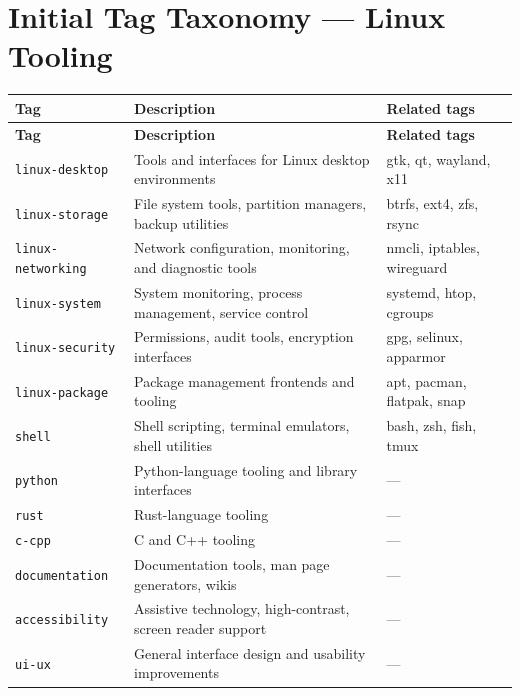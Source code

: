 \documentclass[12pt,a4paper]{article}
\begin{document}
\section{Initial Tag Taxonomy --- Linux Tooling}
\begin{longtable}{L{3.2cm} L{6.5cm} L{3.6cm}}
  \color{white}\bfseries Tag & \color{white}\bfseries Description & \color{white}\bfseries Related tags \\
  \endfirsthead
  \color{white}\bfseries Tag & \color{white}\bfseries Description & \color{white}\bfseries Related tags \\
  \endhead\hline
  \texttt{linux-desktop}    & Tools and interfaces for Linux desktop environments & gtk, qt, wayland, x11 \\
  \texttt{linux-storage}    & File system tools, partition managers, backup utilities & btrfs, ext4, zfs, rsync \\
  \texttt{linux-networking} & Network configuration, monitoring, and diagnostic tools & nmcli, iptables, wireguard \\
  \texttt{linux-system}     & System monitoring, process management, service control & systemd, htop, cgroups \\
  \texttt{linux-security}   & Permissions, audit tools, encryption interfaces & gpg, selinux, apparmor \\
  \texttt{linux-package}    & Package management frontends and tooling & apt, pacman, flatpak, snap \\
  \texttt{shell}            & Shell scripting, terminal emulators, shell utilities & bash, zsh, fish, tmux \\
  \texttt{python}           & Python-language tooling and library interfaces & --- \\
  \texttt{rust}             & Rust-language tooling & --- \\
  \texttt{c-cpp}            & C and C++ tooling & --- \\
  \texttt{documentation}    & Documentation tools, man page generators, wikis & --- \\
  \texttt{accessibility}    & Assistive technology, high-contrast, screen reader support & --- \\
  \texttt{ui-ux}            & General interface design and usability improvements & --- \\
  \hline
\end{longtable}
\end{document}
